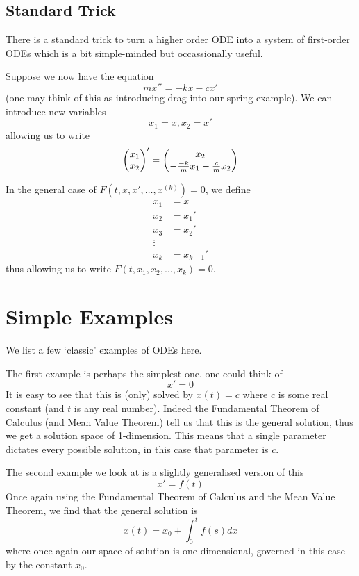 \subsection{Standard Trick}
There is a standard trick to turn a higher order ODE into a system of first-order ODEs which is a bit simple-minded but occassionally useful.
\begin{example}
Suppose we now have the equation
$$ mx'' = -kx - cx' $$
(one may think of this as introducing drag into our spring example). We can introduce new variables
$$ x_1 = x, x_2 = x' $$
allowing us to write
\begin{align*}
    \begin{pmatrix} x_1\\x_2 \end{pmatrix}' = \begin{pmatrix} x_2\\ -\frac{-k}{m}x_1 - \frac{c}{m}x_2 \end{pmatrix}
\end{align*}
\end{example}
In the general case of $F(t, x, x', \dots, x^{(k)}) = 0$, we define
\begin{align*}
    x_1 &= x\\
    x_2 &= x_1'\\
    x_3 &= x_2'\\
    \vdots\\
    x_k &= x_{k - 1}'
\end{align*}
thus allowing us to write $F(t, x_1, x_2, \dots, x_k) = 0$.

\section{Simple Examples}
We list a few `classic' examples of ODEs here. 

The first example is perhaps the simplest one, one could think of
\begin{equation}
    x' = 0
\end{equation}
It is easy to see that this is (only) solved by $x(t) = c$ where $c$ is some real constant (and $t$ is any real number). Indeed the Fundamental Theorem of Calculus (and Mean Value Theorem) tell us that this is the general solution, thus we get a solution space of 1-dimension. This means that a single parameter dictates every possible solution, in this case that parameter is $c$.

The second example we look at is a slightly generalised version of this
\begin{equation}
    x' = f(t)
\end{equation}
Once again using the Fundamental Theorem of Calculus and the Mean Value Theorem, we find that the general solution is
$$ x(t) = x_0 + \int_{0}^{t} f(s) dx $$
where once again our space of solution is one-dimensional, governed in this case by the constant $x_0$.

